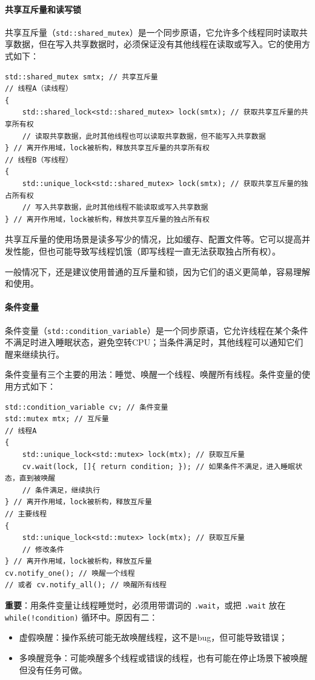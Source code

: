 \paragraph{共享互斥量和读写锁} 共享互斥量（\verb|std::shared_mutex|）是一个同步原语，它允许多个线程同时读取共享数据，但在写入共享数据时，必须保证没有其他线程在读取或写入。它的使用方式如下：
\begin{verbatim}
std::shared_mutex smtx; // 共享互斥量
// 线程A（读线程）
{
    std::shared_lock<std::shared_mutex> lock(smtx); // 获取共享互斥量的共享所有权
    // 读取共享数据，此时其他线程也可以读取共享数据，但不能写入共享数据
} // 离开作用域，lock被析构，释放共享互斥量的共享所有权
// 线程B（写线程）
{
    std::unique_lock<std::shared_mutex> lock(smtx); // 获取共享互斥量的独占所有权
    // 写入共享数据，此时其他线程不能读取或写入共享数据
} // 离开作用域，lock被析构，释放共享互斥量的独占所有权
\end{verbatim}
共享互斥量的使用场景是读多写少的情况，比如缓存、配置文件等。它可以提高并发性能，但也可能导致写线程饥饿（即写线程一直无法获取独占所有权）。

一般情况下，还是建议使用普通的互斥量和锁，因为它们的语义更简单，容易理解和使用。

\paragraph{条件变量} 条件变量（\verb|std::condition_variable|）是一个同步原语，它允许线程在某个条件不满足时进入睡眠状态，避免空转CPU；当条件满足时，其他线程可以通知它们醒来继续执行。

条件变量有三个主要的用法：睡觉、唤醒一个线程、唤醒所有线程。条件变量的使用方式如下：
\begin{verbatim}
std::condition_variable cv; // 条件变量
std::mutex mtx; // 互斥量
// 线程A
{
    std::unique_lock<std::mutex> lock(mtx); // 获取互斥量
    cv.wait(lock, []{ return condition; }); // 如果条件不满足，进入睡眠状态，直到被唤醒
    // 条件满足，继续执行
} // 离开作用域，lock被析构，释放互斥量
// 主要线程
{
    std::unique_lock<std::mutex> lock(mtx); // 获取互斥量
    // 修改条件
} // 离开作用域，lock被析构，释放互斥量
cv.notify_one(); // 唤醒一个线程
// 或者 cv.notify_all(); // 唤醒所有线程
\end{verbatim}
\textbf{重要}：用条件变量让线程睡觉时，必须用带谓词的 \verb|.wait|，或把 \verb|.wait| 放在 \verb|while(!condition)| 循环中。原因有二：
\begin{itemize}
    \item 虚假唤醒：操作系统可能无故唤醒线程，这不是bug，但可能导致错误；
    \item 多唤醒竞争：可能唤醒多个线程或错误的线程，也有可能在停止场景下被唤醒但没有任务可做。
\end{itemize}

